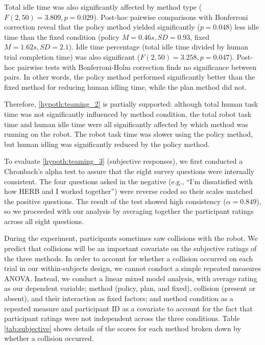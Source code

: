 Total idle time was also significantly affected by method type ($F(2,50)=3.809, p=0.029$). Post-hoc pairwise comparisons with Bonferroni correction reveal that the policy method yielded significantly ($p = 0.048$) less idle time than the fixed condition (policy $M=0.46s, SD=0.93$, fixed $M=1.62s, SD=2.1$). Idle time percentage (total idle time divided by human trial completion time) was also significant ($F(2,50)=3.258, p=0.047$). Post-hoc pairwise tests with Bonferroni-Holm correction finds no significance between pairs. In other words, the policy method performed significantly better than the fixed method for reducing human idling time, while the plan method did not.


Therefore, \cref{hypoth:teaming_2} is partially supported: although total human task time was not significantly influenced by method condition, the total robot task time and human idle time were all significantly affected by which method was running on the robot. The robot task time was slower using the policy method, but human idling was significantly reduced by the policy method.

To evaluate \cref{hypoth:teaming_3} (subjective responses), we first conducted a Chronbach's alpha test to assure that the eight survey questions were internally consistent. The four questions asked in the negative (e.g., ``I'm dissatisfied with how HERB and I worked together'') were reverse coded so their scales matched the positive questions. The result of the test showed high consistency ($\alpha=0.849$), so we proceeded with our analysis by averaging together the participant ratings across all eight questions. 

During the experiment, participants sometimes saw collisions with the robot. We predict that collisions will be an important covariate on the subjective ratings of the three methods. In order to account for whether a collision occurred on each trial in our within-subjects design, we cannot conduct a simple repeated measures ANOVA. Instead, we conduct a linear mixed model analysis, with average rating as our dependent variable; method (policy, plan, and fixed), collision (present or absent), and their interaction as fixed factors; and method condition as a repeated measure and participant ID as a covariate to account for the fact that participant ratings were not independent across the three conditions. Table \ref{tab:subjective} shows details of the scores for each method broken down by whether a collision occurred.

